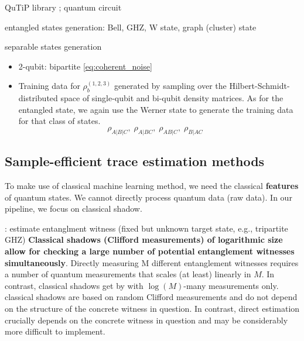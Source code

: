 \documentclass[
reprint,
aps,
pra,
]{revtex4-2}
\theoremstyle{plain}
\theoremstyle{definition}
\newcommand{\dm}{\rho}
\begin{document}
QuTiP library \cite{johanssonQuTiPPythonFramework2013}; quantum circuit \cite{liPulselevelNoisyQuantum2022}

entangled states generation: Bell, GHZ, W state, graph (cluster) state

separable states generation
\begin{itemize}
	\item 2-qubit: bipartite \cref{eq:coherent_noise}
	\item Training data for $\dm_b^{(1,2,3)}$ generated by sampling over the Hilbert-Schmidt-distributed space of single-qubit and bi-qubit density matrices. As for the entangled state, we again use the Werner state to generate the training data for that class of states.
	\begin{equation}
		\dm_{A|B|C},\;
		\dm_{A|BC},\;
		\dm_{AB|C},\;
		\dm_{B|AC}
		\quad
	\end{equation}
\end{itemize}

\subsection{Sample-efficient trace estimation methods}
To make use of classical machine learning method, we need the classical \textbf{features} of quantum states.
We cannot directly process quantum data (raw data).
In our pipeline, we focus on classical shadow.

 \cite{huangPredictingManyProperties2020}: estimate entanglment witness (fixed but unknown target state, e.g., tripartite GHZ)
\textbf{Classical shadows (Clifford measurements) of logarithmic size allow for checking a large number of potential entanglement witnesses simultaneously}.
Directly measuring M diﬀerent entanglement witnesses requires a number of quantum measurements that scales (at least) linearly in $M$. In contrast, classical shadows get by with $\log(M)$-many measurements only.
classical shadows are based on random Clifford measurements and do not depend on the structure of the concrete witness in question. In contrast, direct estimation crucially depends on the concrete witness in question and may be considerably more difficult to implement.
\end{document}
